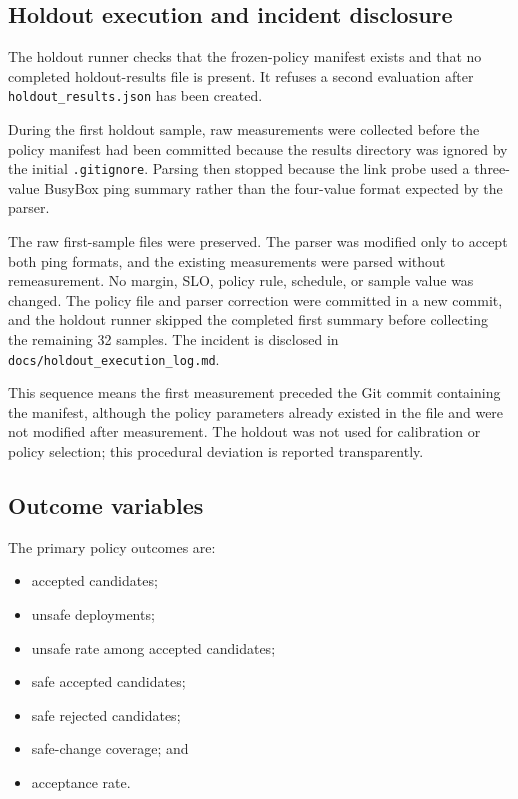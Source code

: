 \subsection{Holdout execution and incident disclosure}

The holdout runner checks that the frozen-policy manifest exists and that no completed holdout-results file is present. It refuses a second evaluation after \texttt{holdout\_results.json} has been created.

During the first holdout sample, raw measurements were collected before the policy manifest had been committed because the results directory was ignored by the initial \texttt{.gitignore}. Parsing then stopped because the link probe used a three-value BusyBox ping summary rather than the four-value format expected by the parser.

The raw first-sample files were preserved. The parser was modified only to accept both ping formats, and the existing measurements were parsed without remeasurement. No margin, SLO, policy rule, schedule, or sample value was changed. The policy file and parser correction were committed in a new commit, and the holdout runner skipped the completed first summary before collecting the remaining 32 samples. The incident is disclosed in \texttt{docs/holdout\_execution\_log.md}.

This sequence means the first measurement preceded the Git commit containing the manifest, although the policy parameters already existed in the file and were not modified after measurement. The holdout was not used for calibration or policy selection; this procedural deviation is reported transparently.

\subsection{Outcome variables}

The primary policy outcomes are:
\begin{itemize}
\item accepted candidates;
\item unsafe deployments;
\item unsafe rate among accepted candidates;
\item safe accepted candidates;
\item safe rejected candidates;
\item safe-change coverage; and
\item acceptance rate.
\end{itemize}

